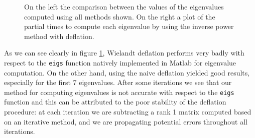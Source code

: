 \begin{figure}[H]
    \caption{On the left the comparison between the values of the eigenvalues computed using all methods shown. On the right a plot of the partial times to compute each eigenvalue by using the inverse power method with deflation.}
    \label{Eigenvalues_comp}
\end{figure}
\noindent As we can see clearly in figure \ref{Eigenvalues_comp}, Wielandt deflation performs very badly with respect to the \texttt{eigs} function natively implemented in Matlab for eigenvalue computation. On the other hand, using the naive deflation yielded good results, especially for the first 7 eigenvalues. After some iterations we see that our method for computing eigenvalues is not accurate with respect to the \texttt{eigs} function and this can be attributed to the poor stability of the deflation procedure: at each iteration we are subtracting a rank 1 matrix computed based on an iterative method, and we are propagating potential errors throughout all iterations. 
